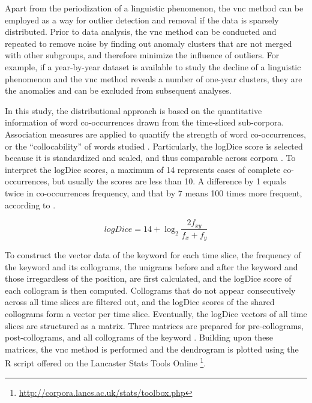 Apart from the periodization of a linguistic phenomenon, the \gls{vnc} method can be employed as a way for outlier detection and removal if the data is sparsely distributed. Prior to data analysis, the \gls{vnc} method can be conducted and repeated to remove noise by finding out anomaly clusters that are not merged with other subgroups, and therefore minimize the influence of outliers. For example, if a year-by-year dataset is available to study the decline of a linguistic phenomenon and the \gls{vnc} method reveals a number of one-year clusters, they are the anomalies and can be excluded from subsequent analyses.

In this study, the distributional approach is based on the quantitative information of word co-occurrences drawn from the time-sliced sub-corpora. Association measures are applied to quantify the strength of word co-occurrences, or the ``collocability'' of words studied \parencite{gablasova2017collocations}. Particularly, the logDice score is selected because it is standardized and scaled, and thus comparable across corpora \parencite{rychly2008lexicographer,gablasova2017collocations}. To interpret the logDice scores, a maximum of 14 represents cases of complete co-occurrences, but usually the scores are less than 10. A difference by 1 equals twice in co-occurrences frequency, and that by 7 means 100 times more frequent, according to .

\begin{equation}
  logDice = 14 + \log_{2}{\frac{2f_{xy}}{f_x + f_y}}
  \label{equ:logDice}
\end{equation}

To construct the vector data of the keyword \jia for each time slice, the frequency of the keyword and its collograms, the unigrams before and after the keyword and those irregardless of the position, are first calculated, and the logDice score of each collogram is then computed. Collograms that do not appear consecutively across all time slices are filtered out, and the logDice scores of the shared collograms form a vector per time slice. Eventually, the logDice vectors of all time slices are structured as a matrix. Three matrices are prepared for pre-collograms, post-collograms, and all collograms of the keyword \jia\rspace. Building upon these matrices, the \gls{vnc} method is performed and the dendrogram is plotted using the R script offered on the Lancaster Stats Tools Online \parencite{brezina2018statistics}\footnote{\url{http://corpora.lancs.ac.uk/stats/toolbox.php}}.

